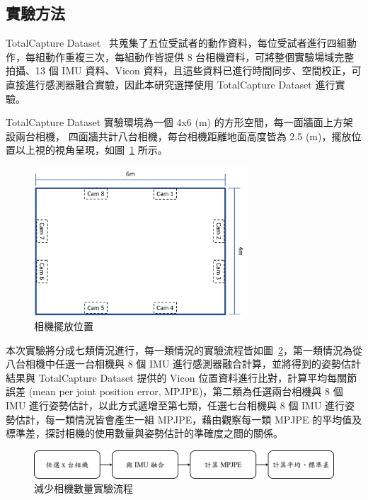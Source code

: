 \subsection{實驗方法}
TotalCapture Dataset~\cite{Trumble:BMVC:2017} 共蒐集了五位受試者的動作資料，每位受試者進行四組動作，每組動作重複三次，每組動作皆提供 8 台相機資料，可將整個實驗場域完整拍攝、13 個 IMU 資料、Vicon 資料，且這些資料已進行時間同步、空間校正，可直接進行感測器融合實驗，因此本研究選擇使用 TotalCapture Dataset 進行實驗。

TotalCapture Dataset 實驗環境為一個 4x6 (m) 的方形空間，每一面牆面上方架設兩台相機，
四面牆共計八台相機，每台相機距離地面高度皆為 2.5 (m)，擺放位置以上視的視角呈現，如圖~\ref{ch3_fig_cameraset_totalcap} 所示。

\begin{figure}[!ht]
   \centering
   \includegraphics[width=8cm]{figure/ch3_fig_cameraset_totalcap.png}
    \caption[相機擺放位置]{相機擺放位置}
    \label{ch3_fig_cameraset_totalcap}
\end{figure}

本次實驗將分成七類情況進行，每一類情況的實驗流程皆如圖~\ref{ch3_fig_cameraset_flow}，第一類情況為從八台相機中任選一台相機與 8 個 IMU 進行感測器融合計算，並將得到的姿勢估計結果與 TotalCapture Dataset 提供的 Vicon 位置資料進行比對，計算平均每關節誤差 (mean per joint position error, MPJPE)，第二類為任選兩台相機與 8 個 IMU 進行姿勢估計，以此方式遞增至第七類，任選七台相機與 8 個 IMU 進行姿勢估計，每一類情況皆會產生一組 MPJPE，藉由觀察每一類 MPJPE 的平均值及標準差，探討相機的使用數量與姿勢估計的準確度之間的關係。

\begin{figure}[!ht]
   \centering
   \includegraphics[width=\linewidth]{figure/ch3_fig_cameraset_flow.png}
    \caption[減少相機數量實驗流程]{減少相機數量實驗流程}
    \label{ch3_fig_cameraset_flow}
\end{figure}

